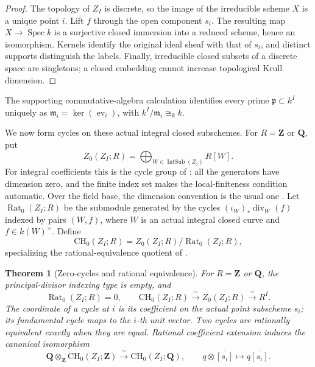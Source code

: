 \documentclass[11pt]{article}
\newtheorem{theorem}{Theorem}[section]
\theoremstyle{definition}
\theoremstyle{remark}
\DeclareMathOperator{\Spec}{Spec}
\DeclareMathOperator{\ev}{ev}
\newcommand{\Q}{\mathbf Q}
\begin{document}
\begin{proof}
The topology of \(Z_I\) is discrete, so the image of the irreducible
scheme \(X\) is a unique point \(i\).  Lift \(f\) through the open
component \(s_i\).  The resulting map \(X\to\Spec k\) is a
surjective closed immersion into a reduced scheme, hence an isomorphism.
Kernels identify the original ideal sheaf with that of \(s_i\), and
distinct supports distinguish the labels.  Finally, irreducible closed
subsets of a discrete space are singletons; a closed embedding cannot
increase topological Krull dimension.
\end{proof}

The supporting commutative-algebra calculation identifies every prime
\(\mathfrak p\subset k^I\) uniquely as
\(\mathfrak m_i=\ker(\ev_i)\), with
\(k^I/\mathfrak m_i\cong_k k\).

We now form cycles on these actual integral closed subschemes.  For
\(R=\mathbf Z\) or \(\Q\), put
\[
  Z_0(Z_I;R)=\bigoplus_{W\in\operatorname{IntSub}(Z_I)}R[W].
\]
For integral coefficients this is the cycle group of
\cite{StacksCycles}: all the generators have dimension zero, and the finite
index set makes the local-finiteness condition automatic.  Over the field
base, the dimension convention is the usual one
\cite{StacksFieldDimensionSetup,StacksCycleDimensionComparison}.
Let \(\operatorname{Rat}_0(Z_I;R)\) be the submodule generated by the
cycles \((\iota_W)_*\operatorname{div}_W(f)\) indexed by pairs
\((W,f)\), where \(W\) is an
actual integral closed curve and \(f\in k(W)^\times\).  Define
\[
  \mathrm{CH}_0(Z_I;R)=Z_0(Z_I;R)/\operatorname{Rat}_0(Z_I;R),
\]
specializing the rational-equivalence quotient of
\cite{StacksRationalEquivalence}.

\begin{theorem}[Zero-cycles and rational equivalence]
\label{thm:split-zero-cycles}
For \(R=\mathbf Z\) or \(\Q\), the principal-divisor indexing type is
empty, and
\[
  \operatorname{Rat}_0(Z_I;R)=0,\qquad
  \mathrm{CH}_0(Z_I;R)\xrightarrow{\ \sim\ }Z_0(Z_I;R)
    \xrightarrow{\ \sim\ }R^I.
\]
The coordinate of a cycle at \(i\) is its coefficient on the actual point
subscheme \(s_i\); its fundamental cycle maps to the \(i\)-th unit vector.
Two cycles are rationally equivalent exactly when they are equal.
Rational coefficient extension induces the canonical isomorphism
\[
  \Q\otimes_{\mathbf Z}\mathrm{CH}_0(Z_I;\mathbf Z)
    \xrightarrow{\ \sim\ }\mathrm{CH}_0(Z_I;\Q),
  \qquad q\otimes\overline{[s_i]}\longmapsto q\overline{[s_i]}.
\]
\end{theorem}
\end{document}
